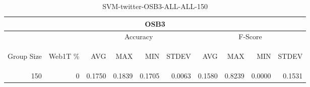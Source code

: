 \begin{center}
\begin{table}[htbp] 
 \begin{center}
\begin{tabular}{ | r | r | r | r | r | r | r | r | r | r |}
\hline
\multicolumn{10}{|c|}{OSB3}\\
\hline
 & & \multicolumn{4}{|c|}{Accuracy} & \multicolumn{4}{|c|}{F-Score}\\ \cline{3-10}
\begin{sideways}Group Size\end{sideways} & \begin{sideways}Web1T \%\end{sideways} & \begin{sideways}AVG\end{sideways} & \begin{sideways}MAX\end{sideways} & \begin{sideways}MIN\end{sideways} & \begin{sideways}STDEV\end{sideways} & \begin{sideways}AVG\end{sideways} & \begin{sideways}MAX\end{sideways} & \begin{sideways}MIN\end{sideways} & \begin{sideways}STDEV\end{sideways}\\
\hline
\multirow{0}{*}{150}
 & 0 & 0.1750 & 0.1839 & 0.1705 & 0.0063 & 0.1580 & 0.8239 & 0.0000 & 0.1531\\ \cline{2-10}
\hline
\end{tabular}
\caption{SVM-twitter-OSB3-ALL-ALL-150}
\label{table:SVM-twitter-OSB3-ALL-ALL-150}
\end{center}
 \end{table}
\end{center}


